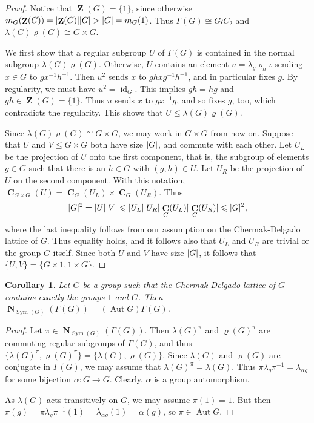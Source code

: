 \documentclass[10pt]{amsart}
\newtheorem{cor}[lemma]{Corollary}
\renewcommand{\rho}{\varrho}
\renewcommand{\leq}{\leqslant}
\newcommand{\iso}{\cong}
\newcommand{\Sym}[1]{\operatorname{Sym}(#1)}
\DeclarePairedDelimiter{\card}{\lvert}{\rvert}
\DeclareMathOperator{\Aut}{Aut}
\DeclareMathOperator{\Zentr}{\mathbf{Z}}
\DeclareMathOperator{\Centrl}{\mathbf{C}}
\DeclareMathOperator{\Norml}{\mathbf{N}}
\DeclareMathOperator{\Id}{id}
\begin{document}
\begin{proof}
    Notice that $\Zentr(G)=\{1\}$, since otherwise
    $m_G(\Zentr(G))=\card{\Zentr(G)}\card{G} > \card{G} = m_G(1)$.
    Thus $\Gamma(G)\iso G\wr C_2$
    and $\lambda(G)\rho(G) \iso G\times G$.
    
    We first show that a regular subgroup $U$ of 
    $\Gamma(G)$ is contained in the normal subgroup
    $\lambda(G) \rho(G)$.
    Otherwise, $U$
    contains an element $u = \lambda_g \rho_h \iota$
    sending $x\in G$ to $ g x^{-1} h^{-1}$.
    Then $u^2$ sends $x$ to $gh x g^{-1}h^{-1}$,
    and in particular fixes $g$.
    By regularity, we must have $u^2 = \Id_G$. 
    This implies 
    $gh = hg $ and 
    $gh\in \Zentr(G) = \{1\}$.
    Thus $u$ sends $x$ to $g x^{-1}g$,
    and so fixes $g$, too, 
    which contradicts the regularity. 
    This shows that $U \leq \lambda(G) \rho(G)$.
    
    Since $\lambda(G) \rho(G)\iso G\times G$, we may work
    in $G\times G$ from now on.
    Suppose that $U$ and $V\leq G\times G$ 
    both have size $\card{G}$,
    and commute with each other.
    Let $U_L$ be the projection of $U$ 
    onto the first component, 
    that is, the subgroup of elements
    $g\in G$ such that there is an $h\in G$
    with $(g,h)\in U$.
    Let $U_R$ be the projection of $U$ on the second component.
    With this notation,
    $\Centrl_{G\times G}(U) = \Centrl_{G}(U_L)\times \Centrl_{G}(U_R)$.
    Thus 
    \[ \card{G}^2 
       = \card{U}\card{V}
       \leq \card{U_L}\card{U_R}
            \card{\Centrl_{G}(U_L)}\card{\Centrl_{G}(U_R)}
       \leq \card{G}^2,
    \]
    where the last inequality follows from our assumption
    on the Chermak-Delgado lattice of $G$.
    Thus equality holds, and it follows also that
    $U_L$ and $U_R$ are trivial or the group $G$ itself.
    Since both $U$ and $V$ have size $\card{G}$,
    it follows that
    $\{U,V\} = \{G\times 1, 1\times G\}$.
\end{proof}

\begin{cor}\label{c:normlgamma}
  Let $G$ be a group such that the Chermak-Delgado lattice of $G$
  contains exactly the groups $1$ and $G$.
  Then $\Norml_{\Sym{G}}(\Gamma(G)) = (\Aut G)\Gamma(G)$.    
\end{cor}

\begin{proof}
  Let $\pi \in \Norml_{\Sym{G}}(\Gamma(G))$.
  Then $\lambda(G)^{\pi}$ and $\rho(G)^{\pi}$
  are commuting regular subgroups of $\Gamma(G)$,
  and thus 
  $\{\lambda(G)^{\pi},\rho(G)^{\pi}\}
   = \{ \lambda(G), \rho(G)\} $.
  Since $\lambda(G)$ and $\rho(G)$ are conjugate in 
  $\Gamma(G)$, 
  we may assume that $\lambda(G)^{\pi}= \lambda(G)$.
  Thus $\pi \lambda_g \pi^{-1} = \lambda_{\alpha g}$
  for some bijection $\alpha\colon G\to G$.
  Clearly, $\alpha$ is a group automorphism.
  
  As $\lambda(G)$ acts transitively on $G$, we may assume
  $\pi(1) = 1$. 
  But then 
  $\pi(g) = \pi\lambda_g \pi^{-1}(1)
          = \lambda_{\alpha g}(1)
          = \alpha(g)$,
  so $\pi\in \Aut G$.
\end{proof}
\end{document}
